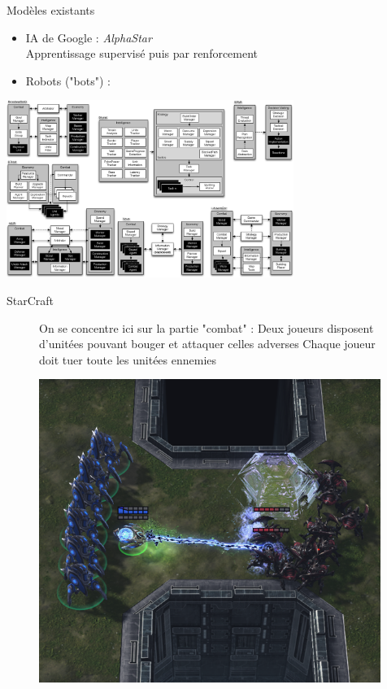 \documentclass[french]{beamer}
\begin{document}
\begin{frame}{Modèles existants}
	\begin{itemize}
		\item IA de Google : \textit{AlphaStar} 
			\\Apprentissage supervisé puis par renforcement
		\item Robots ("bots") :
	\end{itemize}
	\centering
	\includegraphics[width=0.7\textwidth]{architectures.png} 
\end{frame}
\begin{frame}{StarCraft}
\begin{figure}
	\centering
	\begin{minipage}{0.45\textwidth}
		On se concentre ici sur la partie "combat" :
		\vspace{0.3cm}
		Deux joueurs disposent d'unitées pouvant bouger et attaquer celles adverses
		\vspace{0.3cm}
		Chaque joueur doit tuer toute les unitées ennemies
	\end{minipage}\hfill
	\begin{minipage}{0.5\textwidth}
		\centering
		\includegraphics[width=0.99\textwidth]{screen_starcraft_combat.png}
	\end{minipage}
\end{figure}
\end{frame}
\end{document}
